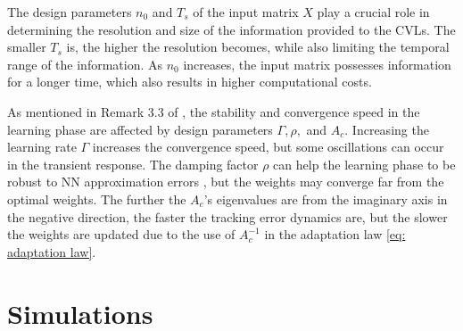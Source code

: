 \documentclass{l4dc2025}
\begin{document}
\begin{remark}
The design parameters $n_0$ and $T_s$ of the input matrix $X$ play a crucial role in determining the resolution and size of the information provided to the CVLs. The smaller $T_s$ is, the higher the resolution becomes, while also limiting the temporal range of the information.
As $n_0$ increases, the input matrix possesses information for a longer time, which also results in higher computational costs.
\label{remark:stack param}
\end{remark}

\begin{remark}
As mentioned in Remark 3.3 of \cite{BookEKcontrol}, the stability and convergence speed in the learning phase are affected by design parameters $\Gamma, \rho,$ and $A_c$. 
Increasing the learning rate $\Gamma$ increases the convergence speed, but some oscillations can occur in the transient response. 
The damping factor $\rho$ can help the learning phase to be robust to NN approximation errors \cite{BookSSGe}, but the weights may converge far from the optimal weights. 
The further the $A_c$'s eigenvalues are from the imaginary axis in the negative direction, the faster the tracking error dynamics are, but the slower the weights are updated due to the use of $A_c^{-1}$ in the adaptation law \eqref{eq: adaptation law}.
\label{remark:2}
\end{remark}

\section{Simulations} \label{sec: sim}
\end{document}
